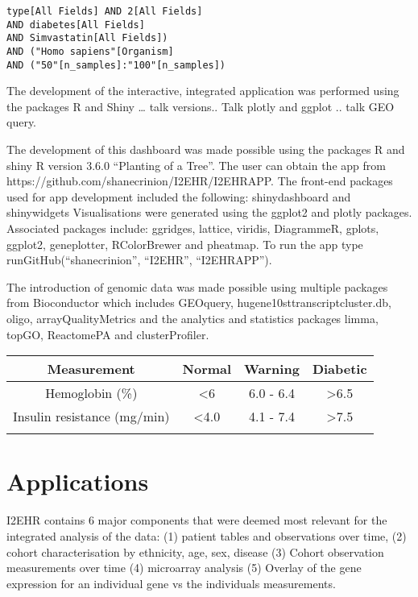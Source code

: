 \documentclass{bioinfo}
\begin{document}
\begin{verbatim}
type[All Fields] AND 2[All Fields]
AND diabetes[All Fields]
AND Simvastatin[All Fields])
AND ("Homo sapiens"[Organism]
AND ("50"[n_samples]:"100"[n_samples])
\end{verbatim}


The development of the interactive, integrated application was performed using the packages R and Shiny … talk versions.. Talk plotly and ggplot .. talk GEO query. 

The development of this dashboard was made possible using the packages R and shiny 
R version 3.6.0 “Planting of a Tree”. The user can obtain the app from https://github.com/shanecrinion/I2EHR/I2EHR\textunderscore APP. The front-end packages used for app development included the following: shinydashboard and shinywidgets Visualisations were generated using the ggplot2 and plotly packages. Associated packages include: ggridges, lattice, viridis, DiagrammeR, gplots, ggplot2, geneplotter, RColorBrewer and pheatmap. To run the app type runGitHub(“shanecrinion”, “I2EHR”, “I2EHR\textunderscore APP”). 

The introduction of genomic data was made possible using multiple packages from Bioconductor which includes GEOquery, hugene10sttranscriptcluster.db, oligo, arrayQualityMetrics and the analytics and statistics packages limma, topGO, ReactomePA and clusterProfiler. 

       
\begin{table}[]
\begin{tabular}{@{}cccc@{}}
\toprule
\textbf{Measurement}        & \textbf{Normal}      & \textbf{Warning}     & \textbf{Diabetic}    \\ \midrule
Hemoglobin (\%)             & \textless 6          & 6.0 - 6.4            & \textgreater 6.5     \\
Insulin resistance (mg/min) & \textless 4.0        & 4.1 - 7.4            & \textgreater 7.5     \\
\multicolumn{1}{l}{}        & \multicolumn{1}{l}{} & \multicolumn{1}{l}{} & \multicolumn{1}{l}{}
\end{tabular}
\end{table}


\section{Applications}
I2EHR contains 6 major components that were deemed most relevant for the integrated analysis of the data: (1) patient tables and observations over time, (2) cohort characterisation by ethnicity, age, sex, disease (3) Cohort observation measurements over time (4) microarray analysis (5) Overlay of the gene expression for an individual gene vs the individuals measurements. 
\end{document}

